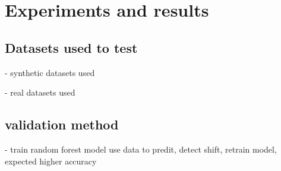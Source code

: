 \chapter{Experiments and results}
\minitoc


\section{Datasets used to test}
- synthetic datasets used

- real datasets used



\section{validation method}

- train random forest model use data to predit, detect shift, retrain model, expected higher accuracy





